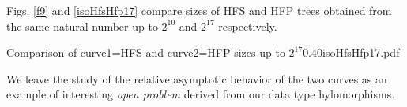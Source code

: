 \documentclass[]{INCLUDES/llncs}
\begin{document}

Figs. \ref{f9} and \ref{isoHfsHfp17} compare sizes of HFS and HFP trees obtained from
the same natural number up to $2^{10}$ and $2^{17}$ respectively. 

{Comparison of curve1=HFS and curve2=HFP sizes up to
$2^{17}$}{0.40}{isoHfsHfp17.pdf}

We leave the study of the relative asymptotic behavior of the two curves 
as an example of interesting {\em open problem} derived from our data type
hylomorphisms.


\begin{comment}
\section{An application: semantic steganography}
Steganography is a technique that conceals information by adding to media
objects like JPG files or MP3 music tracks a few bits encoding a secret message.
While the human eye or ear usually sees no differences in the images or sounds,
statistical techniques can be used to identify a steganographic load as a result of
as distortions in typical distributions.
Semantic variants of steganography also exist, for
instance encoding a load by replacing words with their synonyms in
a sentence or selecting or wearing a particular
dress code in a picture or performing a particular sequence of actions
in a clip. As they involve complex common sense knowledge processing steps such
techniques are unlikely to be subject to statistical detection in any close
future.

Hereditarily finite permutations can provide unusually strong
steganographic encodings without requiring 
any change in the set of objects or events encoding the load.
Such encoding can be achieved by
using solely the (recursive) ordering of naturally occurring observables
in images or texts or behaviors. And, in contrast to ``content'' order is in  a
way invisible - it is just in the eye of the beholder.

For instance the fact that on a day Alice ([]) and Bob ([[]]) visits first a
chatroom discussing about dating in the arrival order [[]],[] then leave it in order [],[[]] and
visit a chatroom about sport cars in arrival order [],[[]] and leave in order
[],[[]] and then on the next day visit first the chatroom on sport cars in order [],[[]]
leaving in order [[]],[] and then the chatroom about dating in arrival 
order [[]],[] leaving in order [[]],[] encodes the HFP:
\begin{code}
secret([[[[[]],[]],[[],[[]]]],[[[],[[]]],[[],[[]]]],[],[],[[[],[[]]],[[[]],[]]]]).
\end{code}



\end{comment}
\end{document}
